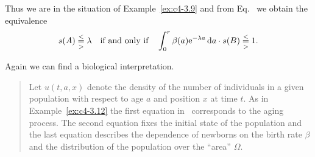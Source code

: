 \begin{example}
Thus we are in the situation of Example~\ref{ex:c4-3.9} and from Eq.~ we obtain the equivalence
\[
s(A) \overset{<}{ \underset{>}{=} } \lambda \quad \text{if and only if} \quad \int_{0}^{r} \beta(a)\mathrm{e}^{-\lambda a} \mathop{}\!\mathrm{d}{a} \cdot s(B) \overset{<}{ \underset{>}{=} } 1 .
\]
\end{example}
Again we can find a biological interpretation.
\begin{quote}
Let $u(t,a,x)$ denote the density of the number of individuals in a given population with respect to age $a$ and position $x$ at time $t$.
As in Example~\ref{ex:c4-3.12} the first equation in~ corresponds to the aging process.
The second equation fixes the initial state of the population and the last equation describes the dependence of newborns on the birth rate $\beta$ and the distribution of the population over the \enquote{area} $\Omega$. 
\end{quote}
